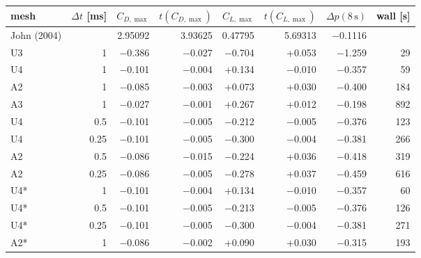 \begin{tabular}{lrrrrrrr}
\toprule
mesh & $\Delta t$ [ms] & $C_{D,\max}$ & $t(C_{D,\max})$ & $C_{L,\max}$ & $t(C_{L,\max})$ & $\Delta p(8\,\mathrm{s})$ & wall [s] \\
\midrule
John (2004) & & 2.95092 & 3.93625 & 0.47795 & 5.69313 & $-$0.1116 & \\
\midrule
U3 & 1 & $-$0.386 & $-$0.027 & $-$0.704 & +0.053 & $-$1.259 & 29 \\
U4 & 1 & $-$0.101 & $-$0.004 & +0.134 & $-$0.010 & $-$0.357 & 59 \\
A2 & 1 & $-$0.085 & $-$0.003 & +0.073 & +0.030 & $-$0.400 & 184 \\
A3 & 1 & $-$0.027 & $-$0.001 & +0.267 & +0.012 & $-$0.198 & 892 \\
U4 & 0.5 & $-$0.101 & $-$0.005 & $-$0.212 & $-$0.005 & $-$0.376 & 123 \\
U4 & 0.25 & $-$0.101 & $-$0.005 & $-$0.300 & $-$0.004 & $-$0.381 & 266 \\
A2 & 0.5 & $-$0.086 & $-$0.015 & $-$0.224 & +0.036 & $-$0.418 & 319 \\
A2 & 0.25 & $-$0.086 & $-$0.005 & $-$0.278 & +0.037 & $-$0.459 & 616 \\
\midrule
U4* & 1 & $-$0.101 & $-$0.004 & +0.134 & $-$0.010 & $-$0.357 & 60 \\
U4* & 0.5 & $-$0.101 & $-$0.005 & $-$0.213 & $-$0.005 & $-$0.376 & 126 \\
U4* & 0.25 & $-$0.101 & $-$0.005 & $-$0.300 & $-$0.004 & $-$0.381 & 271 \\
A2* & 1 & $-$0.086 & $-$0.002 & +0.090 & +0.030 & $-$0.315 & 193 \\
\bottomrule
\end{tabular}
